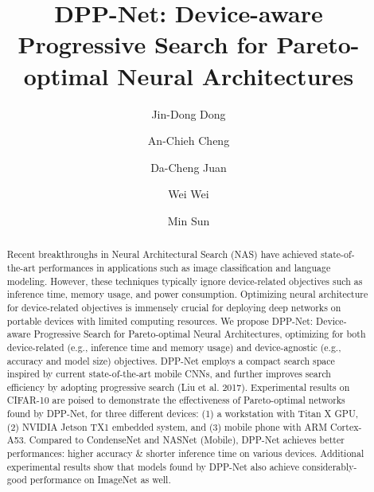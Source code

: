 \documentclass[runningheads]{llncs}
\begin{document}
%
\title{DPP-Net: Device-aware Progressive Search for Pareto-optimal Neural Architectures} 

%
\author{Jin-Dong Dong \and An-Chieh Cheng \and Da-Cheng Juan \and Wei Wei \and Min Sun}
%
%

%
\maketitle              %
%
\begin{abstract}
Recent breakthroughs in Neural Architectural Search (NAS) have achieved state-of-the-art performances in applications such as image classification and language modeling. However, these techniques typically ignore device-related objectives such as inference time, memory usage, and power consumption. Optimizing neural architecture for device-related objectives is immensely crucial for deploying deep networks on portable devices with limited computing resources. We propose DPP-Net: Device-aware Progressive Search for Pareto-optimal Neural Architectures, optimizing for both device-related (e.g., inference time and memory usage) and device-agnostic (e.g., accuracy and model size) objectives.
DPP-Net employs a compact search space inspired by current state-of-the-art mobile CNNs, and further improves search efficiency by adopting progressive search (Liu et al. 2017).
Experimental results on CIFAR-10 are poised to demonstrate the effectiveness of Pareto-optimal networks found by DPP-Net, for three different devices: (1) a workstation with Titan X GPU, (2) NVIDIA Jetson TX1 embedded system, and (3) mobile phone with ARM Cortex-A53. Compared to CondenseNet and NASNet (Mobile), DPP-Net achieves better performances: higher accuracy \& shorter inference time on various devices. Additional experimental results show that models found by DPP-Net also achieve considerably-good performance on ImageNet as well.

\end{abstract}
\end{document}
